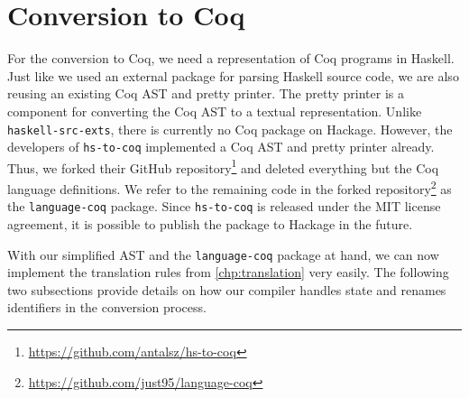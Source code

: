 \section{Conversion to Coq} \label{sec:implementation:coq-ast}
For the conversion to Coq, we need a representation of Coq programs in Haskell.
Just like we used an external package for parsing Haskell source code, we are also reusing an existing Coq AST and pretty printer.
The pretty printer is a component for converting the Coq AST to a textual representation.
Unlike \texttt{haskell-src-exts}, there is currently no Coq package on Hackage.
However, the developers of \texttt{hs-to-coq} implemented a Coq AST and pretty printer already.
Thus, we forked their GitHub repository\footnote{\url{https://github.com/antalsz/hs-to-coq}} and deleted everything but the Coq language definitions.
We refer to the remaining code in the forked repository\footnote{\url{https://github.com/just95/language-coq}} as the \texttt{language-coq} package.
Since \texttt{hs-to-coq} is released under the MIT license agreement, it is possible to publish the package to Hackage in the future.

With our simplified AST and the \texttt{language-coq} package at hand, we can now implement the translation rules from \autoref{chp:translation} very easily.
The following two subsections provide details on how our compiler handles state and renames identifiers in the conversion process.

